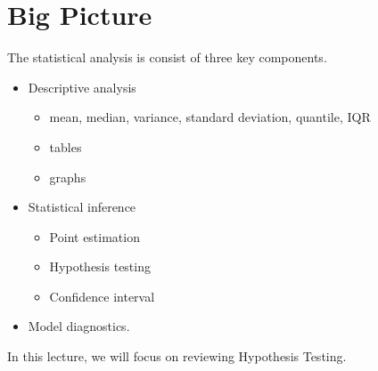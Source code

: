 \section{Big Picture}
The statistical analysis is consist of three key components.
\begin{itemize}
	\item Descriptive analysis
		\begin{itemize}
			\item mean, median, variance, standard deviation, quantile, IQR
			\item tables
			\item graphs
		\end{itemize}
	\item Statistical inference
		\begin{itemize}
			\item Point estimation
			\item Hypothesis testing
			\item Confidence interval
		\end{itemize}
	\item Model diagnostics.
\end{itemize}

In this lecture, we will focus on reviewing Hypothesis Testing.
